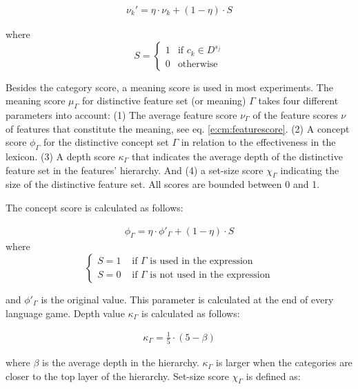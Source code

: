 \begin{eqnarray}
\nu_k'=\eta \cdot \nu_k + (1-\eta) \cdot S
\label{e:cm:featurescore}
\end{eqnarray}

\n
where
\[
S = \left \{ \begin{array}{ll} 1 & \mbox{if } c_k \in D^{s_j}\\
 0 & \mbox{otherwise}
\end{array}
\right. \]

Besides the category score, a meaning score is used in most experiments. The meaning score $\mu_{\Gamma}$ for distinctive feature set (or meaning) $\Gamma$ takes four different parameters into account: (1) The average feature score $\nu_{\Gamma}$ of the feature scores $\nu$ of features that constitute the meaning, see eq. \ref{e:cm:featurescore}. (2) A concept score $\phi_{\Gamma}$ for the distinctive concept set $\Gamma$ in relation to the effectiveness in the lexicon. (3) A depth score $\kappa_{\Gamma}$ that indicates the average depth of the distinctive feature set in the features' hierarchy. And (4) a set-size score $\chi_{\Gamma}$ indicating the size of the distinctive feature set. All scores are bounded between 0 and 1. 

The concept score is calculated as follows:

\begin{eqnarray}
\displaystyle
\phi_{\Gamma}=\eta \cdot \phi'_{\Gamma} + (1-\eta) \cdot S
\end{eqnarray}
\noindent
where
\[
\left \{
\begin{array}{rl}
S=1 & \mbox{ if } \Gamma \mbox{ is used in the expression}\\
S=0 & \mbox{ if } \Gamma \mbox{ is not used in the expression}
\end{array}
\right.
\label{eta}
\]

\noindent
and $\phi'_{\Gamma}$ is the original value. This parameter is calculated at the end of every language game. Depth value $\kappa_{\Gamma}$ is calculated as follows:

\begin{eqnarray}
\displaystyle
\kappa_{\Gamma}=\frac{1}{5} \cdot (5 - \beta)
\end{eqnarray}

\noindent
where $\beta$ is the average depth in the hierarchy. $\kappa_{\Gamma}$ is larger when the categories are closer to the top layer of the hierarchy. Set-size score $\chi_{\Gamma}$ is defined as:

